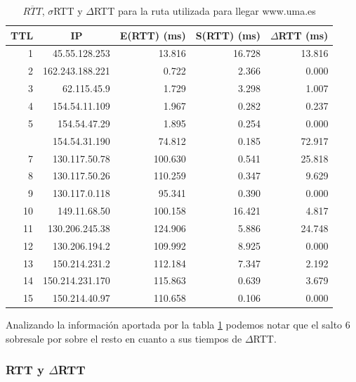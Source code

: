 \begin{table}[H]
    \begin{center}
        \begin{tabular}{| r | r | r | r | r |}
  \hline
  {\bf TTL} & \multicolumn{1}{|c|}{\bf IP} & {\bf E(RTT) (ms)} & {\bf S(RTT) (ms)} & {\bf $\Delta$RTT (ms)}\\
  \hline
\hline 1 & 45.55.128.253 & 13.816 & 16.728 & 13.816\\
\hline 2 & 162.243.188.221 & 0.722 & 2.366 & 0.000\\
\hline 3 & 62.115.45.9 & 1.729 & 3.298 & 1.007\\
\hline 4 & 154.54.11.109 & 1.967 & 0.282 & 0.237\\
\hline 5 & 154.54.47.29 & 1.895 & 0.254 & 0.000\\
\rowcolor{blue!25}\hline 6 & 154.54.31.190 & 74.812 & 0.185 & 72.917\\
\hline 7 & 130.117.50.78 & 100.630 & 0.541 & 25.818\\
\hline 8 & 130.117.50.26 & 110.259 & 0.347 & 9.629\\
\hline 9 & 130.117.0.118 & 95.341 & 0.390 & 0.000\\
\hline 10 & 149.11.68.50 & 100.158 & 16.421 & 4.817\\
\hline 11 & 130.206.245.38 & 124.906 & 5.886 & 24.748\\
\hline 12 & 130.206.194.2 & 109.992 & 8.925 & 0.000\\
\hline 13 & 150.214.231.2 & 112.184 & 7.347 & 2.192\\
\hline 14 & 150.214.231.170 & 115.863 & 0.639 & 3.679\\
\hline 15 & 150.214.40.97 & 110.658 & 0.106 & 0.000\\
\hline
        \end{tabular}
        \caption{$\overline{RTT}$, $\sigma$RTT y $\Delta$RTT para la ruta utilizada para llegar www.uma.es}
        \label{table:malaga} 
    \end{center}
\end{table}

Analizando la información aportada por la tabla \ref{table:malaga} podemos notar que el salto 6 sobresale por sobre el resto en cuanto a sus tiempos de $\Delta$RTT. 

\subsubsection{RTT y $\Delta$RTT}


